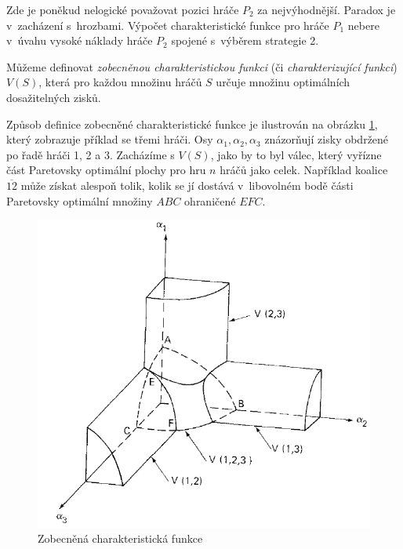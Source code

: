 \documentclass[12pt,a5paper]{article}
\begin{document}
Zde je poněkud nelogické považovat pozici  hráče $P_2$ za nejvýhodnější. Paradox je v~zacházení s~hrozbami. Výpočet charakteristické funkce pro hráče $P_1$ nebere v~úvahu vysoké náklady hráče $P_2$ spojené s~výběrem strategie 2.

Můžeme definovat \emph{zobecněnou charakteristickou funkci} (či \emph{charakterizující funkci}) $V(S)$, která pro každou množinu hráčů $S$ určuje množinu optimálních dosažitelných zisků.

Způsob definice zobecněné charakteristické funkce je ilustrován na obrázku \ref{charfce}, který zobrazuje příklad se třemi hráči. Osy $\alpha_1,\alpha_2,\alpha_3$ znázorňují zisky obdržené po řadě hráči 1, 2 a 3. Zacházíme s $V(S)$, jako by to byl válec, který vyřízne část Paretovsky optimální plochy pro hru $n$ hráčů jako celek. Například koalice $\overline{12}$ může získat alespoň tolik, kolik se jí dostává v~libovolném bodě části Paretovsky optimální množiny $ABC$ ohraničené $EFC$.

\begin{figure}[htb]
\centering
\includegraphics[scale=0.35]{1_6.png}
\caption{Zobecněná charakteristická funkce \label{charfce}}
\end{figure}
\end{document}
